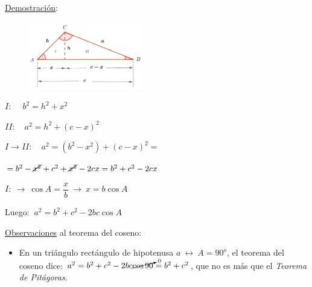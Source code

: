 \underline{Demostración}:

\begin{multicols}{2}
\begin{figure}[H]
	\centering
	\includegraphics[width=0.45\textwidth]{img-triang/triang02.png}
\end{figure}
$I:\quad \ b^2=h^2+x^2$

$II:\quad a^2=h^2+(c-x)^2$

$I\to II:\quad a^2=(b^2-x^2)+(c-x)^2= $

$=b^2-\cancel{x^2}+c^2+\cancel{x^2}-2cx=b^2+c^2-2cx$

$I:\ \to \ \cos A=\dfrac x b \ \to \ x=b\cos A$

Luego: $\ a^2=b^2+c^2-2bc\cos A$ \QED	
\end{multicols}


\vspace{-3mm}

\underline{Observaciones} al teorema del coseno:

\begin{itemize}
\item En un triángulo rectángulo de hipotenusa $a \ \leftrightarrow \ A=90^o$, el teorema del coseno dice: $a^2=b^2+c^2-2bc \cancelto{0}{\cos 90}=b^2+c^2$, que no es más que el \emph{Teorema de Pitágoras}.
\end{itemize}

